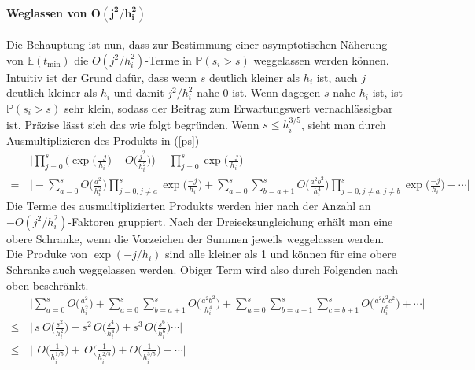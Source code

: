 \documentclass[a4paper, 10pt, ngerman]{article}
\newcommand{\E}{\mathbb{E}}
\renewcommand{\P}{\mathbb{P}}
\begin{document}
\paragraph*{Weglassen von $\pmb{O(j^2/h_i^2)}$} Die Behauptung ist nun, dass zur Bestimmung einer asymptotischen Näherung von $\E(t_{\min})$ die $O(j^2/h_i^2)$-Terme in $\P(s_i > s)$ weggelassen werden können. Intuitiv ist der Grund dafür, dass wenn $s$ deutlich kleiner als $h_i$ ist, auch $j$ deutlich kleiner als $h_i$ und damit $j^2/h_i^2$ nahe 0 ist. Wenn dagegen $s$ nahe $h_i$ ist, ist $\P(s_i > s)$ sehr klein, sodass der Beitrag zum Erwartungswert vernachlässigbar ist. Präzise lässt sich das wie folgt begründen. Wenn $s \le h_{i}^{3/5}$, sieht man durch Ausmultiplizieren des Produkts in (\ref{ps})
\begin{align*}
         & \Bigg \vert \prod_{j = 0}^{s} \Bigg ( \exp \bigg ( \frac {-j}{h_i} \bigg ) - O \bigg ( \frac {j^2} {h_i^2} \bigg ) \Bigg ) - \prod_{j = 0}^{s} \exp \bigg ( \frac {-j}{h_i} \bigg ) \Bigg \vert \\
    = \, & \Bigg \vert - \sum_{a = 0}^{s} O \bigg ( \frac {a^2} {h_i^2} \bigg ) \prod_{j = 0, j \ne a}^{s} \exp \bigg ( \frac {-j}{h_i} \bigg ) +
    \sum_{a = 0}^{s} \sum_{b = a + 1}^{s} O \bigg ( \frac {a^2b^2} {h_i^4} \bigg ) \prod_{j = 0, j \ne a, j \ne b}^{s} \exp \bigg ( \frac {-j}{h_i} \bigg ) - \cdots \Bigg \vert
\end{align*}
Die Terme des ausmultiplizierten Produkts werden hier nach der Anzahl an $-O(j^2/h_i^2)$-Faktoren gruppiert. Nach der Dreiecksungleichung erhält man eine obere Schranke, wenn die Vorzeichen der Summen jeweils weggelassen werden. Die Produke von $\exp(-j/h_i)$ sind alle kleiner als 1 und können für eine obere Schranke auch weggelassen werden. Obiger Term wird also durch Folgenden nach oben beschränkt.
\begin{align*}
           & \Bigg \vert \sum_{a = 0}^{s} O \bigg ( \frac {a^2} {h_i^2} \bigg ) +
    \sum_{a = 0}^{s} \sum_{b = a + 1}^{s} O \bigg ( \frac {a^2b^2} {h_i^4} \bigg ) + \sum_{a = 0}^{s} \sum_{b = a + 1}^{s} \sum_{c = b + 1}^{s} O \bigg ( \frac {a^2b^2c^2} {h_i^6} \bigg ) + \cdots \Bigg \vert \\
    \le \, & \Bigg \vert \, s \ O \bigg ( \frac {s^2} {h_i^2} \bigg ) +
    s^2 \, O \bigg ( \frac {s^4} {h_i^4} \bigg ) + s^3 \,  O \bigg ( \frac {s^6} {h_i^6} \bigg ) \cdots \Bigg \vert                                                                                              \\
    \le \, & \Bigg \vert \, \ O \bigg ( \frac 1 {h_i^{1/5}} \bigg ) + \, O \bigg ( \frac 1 {h_i^{2/5}} \bigg ) +  O \bigg ( \frac 1 {h_i^{3/5}} \bigg ) + \cdots \Bigg \vert
\end{align*}
\end{document}
